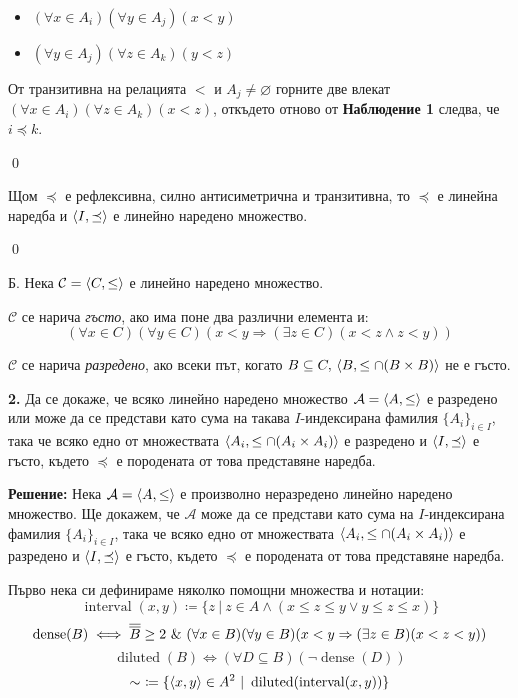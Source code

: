 \begin{problem}
\begin{tcolorbox}[mybox, title={Доказателство:}]
\begin{itemize}
\item
$(\forall x \in A_i)(\forall y \in A_j)(x < y)$
\item
$(\forall y \in A_j)(\forall z \in A_k)(y < z)$
\end{itemize}

\quad
От транзитивна на релацията $<$ и $A_j \neq \varnothing$ горните две влекат
$(\forall x \in A_i)(\forall z \in A_k)(x < z)$,
откъдето отново от \textbf{Наблюдение 1} следва, че $i \preceq k$.

\qed
\end{tcolorbox}

\quad
Щом $\preceq$ е рефлексивна, силно антисиметрична и транзитивна, то $\preceq$ е линейна наредба
и $\langle I, \preceq \rangle$ е линейно наредено множество.

\qed

\quad
Б. Нека $\mathcal{C} = \langle C, \leq \rangle$ е линейно наредено множество.

\quad
$\mathcal{C}$ се нарича \textit{гъсто}, ако има поне два различни елемента и:
\[
(\forall x \in C)(\forall y \in C)(x < y \Rightarrow (\exists z \in C)(x < z \land z < y))
\]

\quad
$\mathcal{C}$ се нарича \textit{разредено}, ако всеки път,
когато $B \subseteq C,\, \langle B, \leq \cap (B \times B) \rangle$ не е гъсто.

\quad
\textbf{2.} Да се докаже, че всяко линейно наредено множество $\mathcal{A} = \langle A, \leq \rangle$ е
разредено или може да се представи като сума на такава $I$-индексирана
фамилия $\{A_i\}_{i \in I}$, така че всяко едно от множествата $\langle A_i, \leq \cap (A_i \times A_i) \rangle$
е разредено и $\langle I, \preceq \rangle$ е гъсто, където $\preceq$ е породената от това представяне наредба.

\bigbreak
\textbf{Решение:}
\smallbreak
\quad
Нека $\mathcal{A} = \langle A, \le \rangle$ е произволно неразредено линейно наредено множество.
Ще докажем, че $\mathcal{A}$ може да се представи като сума на $I$-индексирана фамилия $\{A_i\}_{i \in I}$,
така че всяко едно от множествата $\langle A_i, \leq \cap (A_i \times A_i) \rangle$
е разредено и $\langle I, \preceq \rangle$ е гъсто, където $\preceq$ е породената от това представяне наредба.

\quad
Първо нека си дефинираме няколко помощни множества и нотации:
\[
\operatorname{interval}(x, y) \coloneq \{z\ |\ z \in A \land (x \le z \le y \lor y \le z \le x)\}
\]
\[
\operatorname{dense}(B) \iff \overline{\overline{B}} \ge 2 \ \&\  (\forall x \in B)(\forall y \in B)(x < y \Rightarrow (\exists z \in B)(x < z < y))
\]
\[
\operatorname{diluted}(B) \iff (\forall D \subseteq B)(\neg \operatorname{dense}(D))
\]
\[
\sim\ \coloneq \{\pair{x, y} \in A^2\ |\ \operatorname{diluted}(\operatorname{interval}(x, y))\}
\]


\end{problem}
